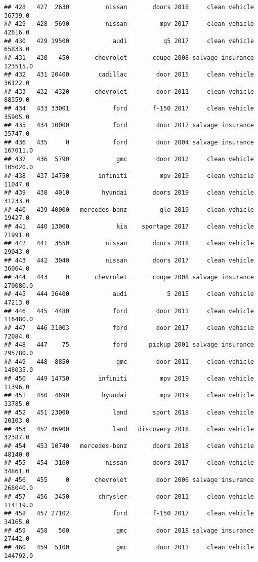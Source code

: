 \documentclass[
]{article}
\begin{document}
\begin{verbatim}
## 428   427  2630          nissan       doors 2018     clean vehicle   36739.0
## 429   428  5690          nissan         mpv 2017     clean vehicle   42616.0
## 430   429 19500            audi          q5 2017     clean vehicle   65833.0
## 431   430   450       chevrolet       coupe 2008 salvage insurance  123515.0
## 432   431 20400        cadillac        door 2015     clean vehicle   36122.0
## 433   432  4320       chevrolet        door 2011     clean vehicle   88359.0
## 434   433 33001            ford       f-150 2017     clean vehicle   35905.0
## 435   434 10000            ford        door 2017 salvage insurance   35747.0
## 436   435     0            ford        door 2004 salvage insurance  167011.0
## 437   436  5790             gmc        door 2012     clean vehicle  105020.0
## 438   437 14750        infiniti         mpv 2019     clean vehicle   11047.0
## 439   438  4010         hyundai       doors 2019     clean vehicle   31233.0
## 440   439 40000   mercedes-benz         gle 2019     clean vehicle   19427.0
## 441   440 13000             kia    sportage 2017     clean vehicle   71991.0
## 442   441  3550          nissan       doors 2018     clean vehicle   29043.0
## 443   442  3040          nissan       doors 2017     clean vehicle   36064.0
## 444   443     0       chevrolet       coupe 2008 salvage insurance  270080.0
## 445   444 36400            audi           5 2015     clean vehicle   47213.0
## 446   445  4480            ford        door 2011     clean vehicle  116480.0
## 447   446 31003            ford        door 2017     clean vehicle   72084.0
## 448   447    75            ford      pickup 2001 salvage insurance  295780.0
## 449   448  8850             gmc        door 2011     clean vehicle  148035.0
## 450   449 14750        infiniti         mpv 2019     clean vehicle   11396.0
## 451   450  4690         hyundai         mpv 2019     clean vehicle   33785.0
## 452   451 23000            land       sport 2018     clean vehicle   20103.0
## 453   452 46900            land   discovery 2018     clean vehicle   32387.0
## 454   453 10740   mercedes-benz       doors 2018     clean vehicle   48140.0
## 455   454  3160          nissan       doors 2017     clean vehicle   34861.0
## 456   455     0       chevrolet        door 2006 salvage insurance  268040.0
## 457   456  3450        chrysler        door 2011     clean vehicle  114119.0
## 458   457 27102            ford       f-150 2017     clean vehicle   34165.0
## 459   458   500             gmc        door 2018 salvage insurance   27442.0
## 460   459  5100             gmc        door 2011     clean vehicle  144792.0

\end{verbatim}
\end{document}
